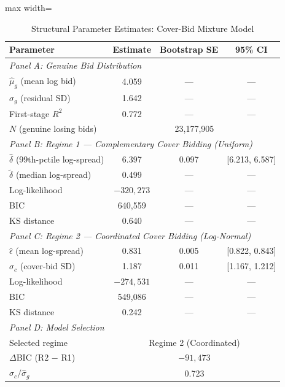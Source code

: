 \begin{table}[htbp]
\centering
\caption{Structural Parameter Estimates: Cover-Bid Mixture Model}
\label{tab:structural_params}
\begin{adjustbox}{max width=\textwidth}
\begin{threeparttable}
\small
\begin{tabular}{lccc}
\toprule
Parameter & Estimate & Bootstrap SE & 95\% CI \\
\midrule
\multicolumn{4}{l}{\textit{Panel A: Genuine Bid Distribution}} \\[3pt]
$\hat{\mu}_g$ (mean log bid) & 4.059 & --- & --- \\
$\hat{\sigma}_g$ (residual SD) & 1.642 & --- & --- \\
First-stage $R^2$ & 0.772 & --- & --- \\
$N$ (genuine losing bids) & \multicolumn{3}{c}{23,177,905} \\
\midrule
\multicolumn{4}{l}{\textit{Panel B: Regime 1 --- Complementary Cover Bidding (Uniform)}} \\[3pt]
$\hat{\delta}$ (99th-pctile log-spread) & 6.397 & 0.097 & [6.213, 6.587] \\
$\tilde{\delta}$ (median log-spread) & 0.499 & --- & --- \\
Log-likelihood & $-320,273$ & --- & --- \\
BIC & 640,559 & --- & --- \\
KS distance & 0.640 & --- & --- \\
\midrule
\multicolumn{4}{l}{\textit{Panel C: Regime 2 --- Coordinated Cover Bidding (Log-Normal)}} \\[3pt]
$\hat{\epsilon}$ (mean log-spread) & 0.831 & 0.005 & [0.822, 0.843] \\
$\hat{\sigma}_c$ (cover-bid SD) & 1.187 & 0.011 & [1.167, 1.212] \\
Log-likelihood & $-274,531$ & --- & --- \\
BIC & 549,086 & --- & --- \\
KS distance & 0.242 & --- & --- \\
\midrule
\multicolumn{4}{l}{\textit{Panel D: Model Selection}} \\[3pt]
Selected regime & \multicolumn{3}{c}{Regime 2 (Coordinated)} \\
$\Delta$BIC (R2 $-$ R1) & \multicolumn{3}{c}{$-91,473$} \\
$\hat{\sigma}_c / \hat{\sigma}_g$ & \multicolumn{3}{c}{0.723} \\

\end{tabular}
\end{threeparttable}
\end{adjustbox}
\end{table}
